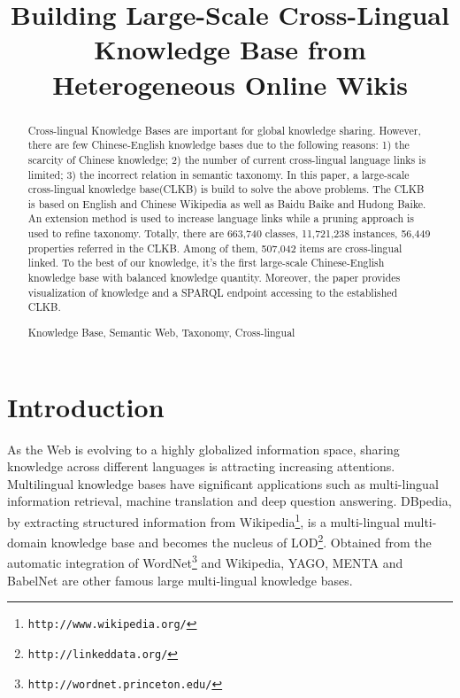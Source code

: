 \documentclass[runningheads,a4paper]{llncs}
\newcommand{\keywords}[1]{\par\addvspace\baselineskip\noindent\keywordname\enspace\ignorespaces#1}
\begin{document}
\mainmatter

\title{Building Large-Scale Cross-Lingual Knowledge Base from Heterogeneous Online Wikis}


\maketitle

\begin{abstract}
Cross-lingual Knowledge Bases are important for global knowledge sharing. However, there are few Chinese-English knowledge bases due to the following reasons: 1) the scarcity of Chinese knowledge; 2) the number of current cross-lingual language links is limited; 3) the incorrect relation in semantic taxonomy. In this paper, a large-scale cross-lingual knowledge base(CLKB) is build to solve the above problems. The CLKB is based on English and Chinese Wikipedia as well as Baidu Baike and Hudong Baike. An extension method is used to increase language links while a pruning approach is used to refine taxonomy. Totally, there are 663,740 classes, 11,721,238 instances, 56,449 properties referred in the CLKB. Among of them, 507,042 items are cross-lingual linked. To the best of our knowledge, it's the first large-scale Chinese-English knowledge base with balanced knowledge quantity. Moreover, the paper provides visualization of knowledge and a SPARQL endpoint accessing to the established CLKB.

\keywords{Knowledge Base, Semantic Web, Taxonomy, Cross-lingual}
\end{abstract}

\section{Introduction}
As the Web is evolving to a highly globalized information space, sharing knowledge across different languages is attracting increasing attentions. Multilingual knowledge bases have significant applications such as multi-lingual information retrieval, machine translation and deep question answering. DBpedia, by extracting structured information from Wikipedia\footnote{{\tt http://www.wikipedia.org/}}, is a multi-lingual multi-domain knowledge base and becomes the nucleus of LOD\footnote{{\tt http://linkeddata.org/}}. Obtained from the automatic integration of WordNet\footnote{{\tt http://wordnet.princeton.edu/}} and Wikipedia, YAGO, MENTA and BabelNet are other famous large multi-lingual knowledge bases.
\end{document}
